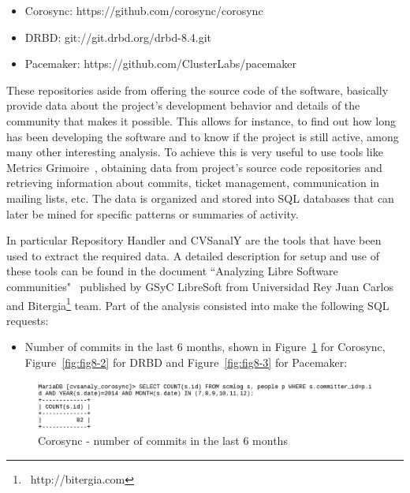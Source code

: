 \documentclass[a4paper, 12pt]{book}
\begin{document}
\begin{itemize}
	\item Corosync: https://github.com/corosync/corosync
	\item DRBD: git://git.drbd.org/drbd-8.4.git
	\item Pacemaker: https://github.com/ClusterLabs/pacemaker
\end{itemize}

\noindent These repositories aside from offering the source code of the software, basically provide data about the project's development behavior and details of the community that makes it possible. This allows for instance, to find out how long has been developing the software and to know if the project is still active, among many other interesting analysis. To achieve this is very useful to use tools like Metrics Grimoire~\cite{GSyC}, obtaining data from project's source code repositories and retrieving information about commits, ticket management, communication in mailing lists, etc. The data is organized and stored into SQL databases that can later be mined for specific patterns or summaries of activity. \bigskip

\noindent In particular Repository Handler and CVSanalY are the tools that have been used to extract the required data. A detailed description for setup and use of these tools can be found in the document ``Analyzing Libre Software communities"~\cite{IandR} published by GSyC LibreSoft from Universidad Rey Juan Carlos and Bitergia\footnote{{\tiny\ http://bitergia.com}} team. Part of the analysis consisted into make the following SQL requests:

\begin{itemize}
      \item Number of commits in the last 6 months, shown in Figure~\ref{fig:fig8-1} for Corosync, Figure~\ref{fig:fig8-2} for DRBD and Figure~\ref{fig:fig8-3} for Pacemaker:
\end{itemize}

    \begin{figure}[H]
      \centering
      \includegraphics[scale=0.30]{fig8-1.png}
      \caption[Commits in the last 6 months for Corosync]{Corosync - number of commits in the last 6 months}
      \label{fig:fig8-1}
    \end{figure}
	  
\end{document}
